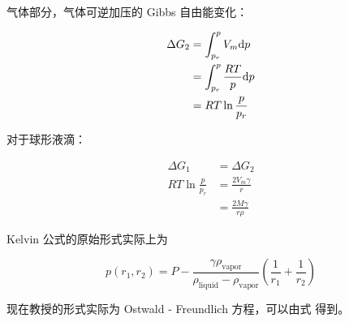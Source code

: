 气体部分，气体可逆加压的 Gibbs 自由能变化：

\begin{align}
    \Delta G_2 & = \int_{p_r}^p V_m \mathrm{d} p          \\
               & = \int_{p_r}^p \frac{RT}{p} \mathrm{d} p \\
               & = RT \ln \frac{p}{p_r}
\end{align}

对于球形液滴：

\begin{align}
    \Delta G_1           & = \Delta G_2              \\
    RT \ln \frac{p}{p_r} & = \frac{2V_m \gamma}{r}   \\
                         & = \frac{2M\gamma}{r \rho}
\end{align}


Kelvin 公式的原始形式实际上为

\begin{equation}
    \label{eq:kelvin}
    p(r_1, r_2) = P - \frac{\gamma \rho_{\mathrm{vapor}}}
    {\rho_{\mathrm{liquid}} - \rho_{\mathrm{vapor}}}
    \left(\frac{1}{r_1} + \frac{1}{r_2}\right)
\end{equation}

现在教授的形式实际为 Ostwald - Freundlich 方程，可以由式  得到。
